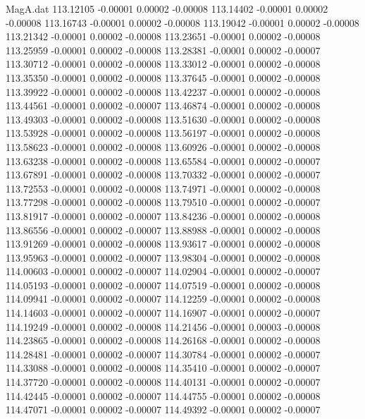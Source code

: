 \begin{filecontents}{MagA.dat}
 113.12105   -0.00001    0.00002   -0.00008
 113.14402   -0.00001    0.00002   -0.00008
 113.16743   -0.00001    0.00002   -0.00008
 113.19042   -0.00001    0.00002   -0.00008
 113.21342   -0.00001    0.00002   -0.00008
 113.23651   -0.00001    0.00002   -0.00008
 113.25959   -0.00001    0.00002   -0.00008
 113.28381   -0.00001    0.00002   -0.00007
 113.30712   -0.00001    0.00002   -0.00008
 113.33012   -0.00001    0.00002   -0.00008
 113.35350   -0.00001    0.00002   -0.00008
 113.37645   -0.00001    0.00002   -0.00008
 113.39922   -0.00001    0.00002   -0.00008
 113.42237   -0.00001    0.00002   -0.00008
 113.44561   -0.00001    0.00002   -0.00007
 113.46874   -0.00001    0.00002   -0.00008
 113.49303   -0.00001    0.00002   -0.00008
 113.51630   -0.00001    0.00002   -0.00008
 113.53928   -0.00001    0.00002   -0.00008
 113.56197   -0.00001    0.00002   -0.00008
 113.58623   -0.00001    0.00002   -0.00008
 113.60926   -0.00001    0.00002   -0.00008
 113.63238   -0.00001    0.00002   -0.00008
 113.65584   -0.00001    0.00002   -0.00007
 113.67891   -0.00001    0.00002   -0.00008
 113.70332   -0.00001    0.00002   -0.00007
 113.72553   -0.00001    0.00002   -0.00008
 113.74971   -0.00001    0.00002   -0.00008
 113.77298   -0.00001    0.00002   -0.00008
 113.79510   -0.00001    0.00002   -0.00007
 113.81917   -0.00001    0.00002   -0.00007
 113.84236   -0.00001    0.00002   -0.00008
 113.86556   -0.00001    0.00002   -0.00007
 113.88988   -0.00001    0.00002   -0.00008
 113.91269   -0.00001    0.00002   -0.00008
 113.93617   -0.00001    0.00002   -0.00008
 113.95963   -0.00001    0.00002   -0.00007
 113.98304   -0.00001    0.00002   -0.00008
 114.00603   -0.00001    0.00002   -0.00007
 114.02904   -0.00001    0.00002   -0.00007
 114.05193   -0.00001    0.00002   -0.00007
 114.07519   -0.00001    0.00002   -0.00008
 114.09941   -0.00001    0.00002   -0.00007
 114.12259   -0.00001    0.00002   -0.00008
 114.14603   -0.00001    0.00002   -0.00007
 114.16907   -0.00001    0.00002   -0.00007
 114.19249   -0.00001    0.00002   -0.00008
 114.21456   -0.00001    0.00003   -0.00008
 114.23865   -0.00001    0.00002   -0.00008
 114.26168   -0.00001    0.00002   -0.00008
 114.28481   -0.00001    0.00002   -0.00007
 114.30784   -0.00001    0.00002   -0.00007
 114.33088   -0.00001    0.00002   -0.00008
 114.35410   -0.00001    0.00002   -0.00007
 114.37720   -0.00001    0.00002   -0.00008
 114.40131   -0.00001    0.00002   -0.00007
 114.42445   -0.00001    0.00002   -0.00007
 114.44755   -0.00001    0.00002   -0.00008
 114.47071   -0.00001    0.00002   -0.00007
 114.49392   -0.00001    0.00002   -0.00007

\end{filecontents}
